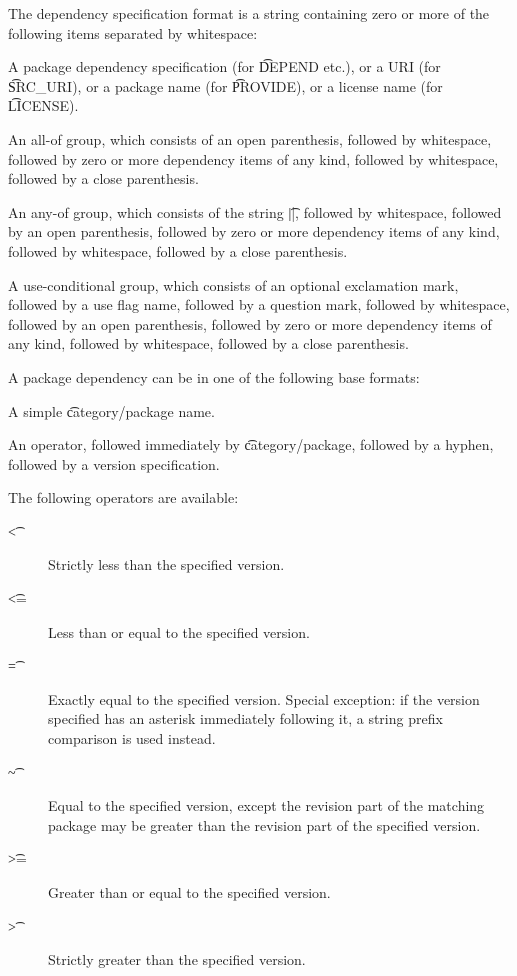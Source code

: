 The dependency specification format is a string containing zero or more of the following
items separated by whitespace:

\begin{bulletlist}
\item A package dependency specification (for \t{DEPEND} etc.), or a URI (for \t{SRC\_URI}),
    or a package name (for \t{PROVIDE}), or a license name (for \t{LICENSE}).
\item An all-of group, which consists of an open parenthesis, followed by whitespace,
    followed by zero or more dependency items of any kind, followed by whitespace, followed
    by a close parenthesis.
\item An any-of group, which consists of the string \t{||}, followed by whitespace,
    followed by an open parenthesis, followed by zero or more dependency items of any kind,
    followed by whitespace, followed by a close parenthesis.
\item A use-conditional group, which consists of an optional exclamation mark, followed by
    a use flag name, followed by a question mark, followed by whitespace, followed by
    an open parenthesis, followed by zero or more dependency items of any kind, followed by
    whitespace, followed by a close parenthesis.
\end{bulletlist}

A package dependency can be in one of the following base formats:

\begin{bulletlist}
\item A simple \t{category/package} name.
\item An operator, followed immediately by \t{category/package}, followed by a hyphen,
   followed by a version specification.
\end{bulletlist}

The following operators are available:

\begin{description}
\item[\t{<}] Strictly less than the specified version.
\item[\t{<=}] Less than or equal to the specified version.
\item[\t{=}] Exactly equal to the specified version. Special exception: if the version
    specified has an asterisk immediately following it, a string prefix comparison is
    used instead.
\item[\t{\~}] Equal to the specified version, except the revision part of the matching
    package may be greater than the revision part of the specified version.
\item[\t{>=}] Greater than or equal to the specified version.
\item[\t{>}] Strictly greater than the specified version.
\end{description}

